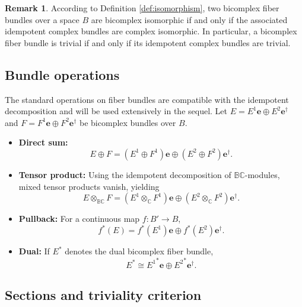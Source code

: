 \documentclass[11pt]{amsart}
\newcommand{\BC}{\mathbb{BC}}       %
\newcommand{\C}{\mathbb{C}}          %
\newcommand{\e}{\mathbf{e}}          %
\newcommand{\ed}{\mathbf{e}^\dagger} %
\theoremstyle{definition}
\newtheorem{remark}[prop]{Remark}            %
\begin{document}
\begin{remark}\label{remark:idptbundles} According to Definition \ref{def:isomorphism}, two bicomplex fiber bundles over a space $B$ are bicomplex isomorphic if and only if the associated idempotent complex bundles are complex isomorphic. In particular, a bicomplex fiber bundle is trivial if and only if its idempotent complex bundles are trivial.
\end{remark}

\subsection{Bundle operations}

The standard operations on fiber bundles are compatible with the idempotent decomposition and will be used extensively in the sequel. Let $E = E^1 \e \oplus E^2 \ed$ and $F = F^1 \e \oplus F^2 \ed$ be bicomplex bundles over $B$.

\begin{itemize}
    \item \textbf{Direct sum:}
    \begin{equation*}
        E \oplus F = (E^1 \oplus F^1)\e \oplus (E^2 \oplus F^2)\ed.
    \end{equation*}

    \item \textbf{Tensor product:} Using the idempotent decomposition of $\BC$-modules, mixed tensor products vanish, yielding
    \begin{equation*}
        E \otimes_{\BC} F = (E^1 \otimes_\C F^1)\e \oplus (E^2 \otimes_\C F^2)\ed. 
    \end{equation*}

    \item \textbf{Pullback:} For a continuous map $f:B' \to B$,
    \begin{equation*}
        f^*(E) = f^*(E^1)\e \oplus f^*(E^2)\ed.
    \end{equation*}
    \item \textbf{Dual:} If $E^*$ denotes the dual bicomplex fiber bundle,
    \begin{equation*}
        E^*\cong {E^1}^*\e\oplus {E^2}^*\ed.
    \end{equation*}
\end{itemize}

\subsection{Sections and triviality criterion}
\end{document}
